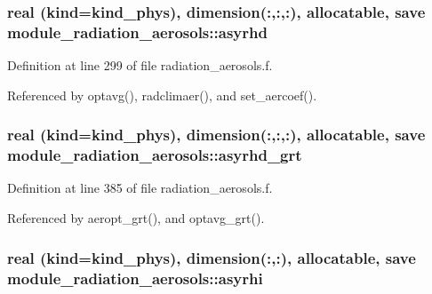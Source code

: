 \subsubsection[{\texorpdfstring{asyrhd}{asyrhd}}]{\setlength{\rightskip}{0pt plus 5cm}real (kind=kind\+\_\+phys), dimension(\+:,\+:,\+:), allocatable, save module\+\_\+radiation\+\_\+aerosols\+::asyrhd\hspace{0.3cm}{\ttfamily [private]}}\hypertarget{namespacemodule__radiation__aerosols_a090d37e62ba333db64e28bf89e89a08d}{}\label{namespacemodule__radiation__aerosols_a090d37e62ba333db64e28bf89e89a08d}


Definition at line 299 of file radiation\+\_\+aerosols.\+f.



Referenced by optavg(), radclimaer(), and set\+\_\+aercoef().

\subsubsection[{\texorpdfstring{asyrhd\+\_\+grt}{asyrhd_grt}}]{\setlength{\rightskip}{0pt plus 5cm}real (kind=kind\+\_\+phys), dimension(\+:,\+:,\+:), allocatable, save module\+\_\+radiation\+\_\+aerosols\+::asyrhd\+\_\+grt\hspace{0.3cm}{\ttfamily [private]}}\hypertarget{namespacemodule__radiation__aerosols_a2da45b8bd425415ca417f6590cc54da6}{}\label{namespacemodule__radiation__aerosols_a2da45b8bd425415ca417f6590cc54da6}


Definition at line 385 of file radiation\+\_\+aerosols.\+f.



Referenced by aeropt\+\_\+grt(), and optavg\+\_\+grt().

\subsubsection[{\texorpdfstring{asyrhi}{asyrhi}}]{\setlength{\rightskip}{0pt plus 5cm}real (kind=kind\+\_\+phys), dimension(\+:,\+:), allocatable, save module\+\_\+radiation\+\_\+aerosols\+::asyrhi\hspace{0.3cm}{\ttfamily [private]}}\hypertarget{namespacemodule__radiation__aerosols_aac2d735c117dd7d1e72264e611764f79}{}\label{namespacemodule__radiation__aerosols_aac2d735c117dd7d1e72264e611764f79}


